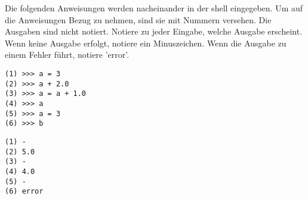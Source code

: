 \question[3]
Die folgenden Anweisungen werden nacheinander in der shell eingegeben. Um auf die Anweisungen Bezug
zu nehmen, sind sie mit Nummern versehen. Die Ausgaben sind nicht notiert.
Notiere zu jeder Eingabe, welche Ausgabe
erscheint. Wenn keine Ausgabe erfolgt, notiere
ein Minuszeichen. Wenn die Ausgabe zu einem Fehler führt, notiere 'error'.

\begin{lstlisting}
(1) >>> a = 3
(2) >>> a + 2.0
(3) >>> a = a + 1.0
(4) >>> a
(5) >>> a = 3
(6) >>> b
\end{lstlisting}
\begin{solutionbox}{5cm}
\begin{lstlisting}
(1) -
(2) 5.0
(3) -
(4) 4.0 
(5) -
(6) error
\end{lstlisting}
\end{solutionbox}
